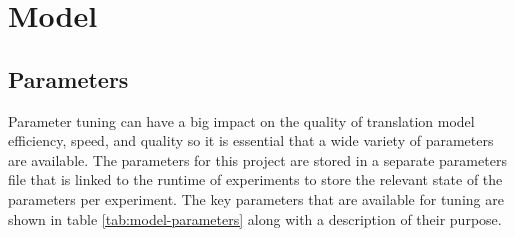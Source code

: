





\section{Model}
\label{sec:3-model}
\subsection{Parameters}

Parameter tuning can have a big impact on the quality of translation model efficiency, speed, and quality so it is essential that a wide variety of parameters are available. The parameters for this project are stored in a separate parameters file that is linked to the runtime of experiments to store the relevant state of the parameters per experiment. The key parameters that are available for tuning are shown in table \ref{tab:model-parameters} along with a description of their purpose.



